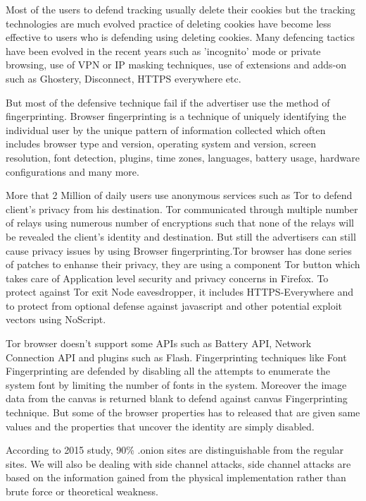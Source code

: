\documentclass[conference]{IEEEtran}
\begin{document}
Most of the users to defend tracking usually delete their cookies but the tracking technologies are much evolved practice of deleting cookies have become less effective to users who is defending using deleting cookies. Many defencing tactics have been evolved in the recent years such as 'incognito' mode or private browsing, use of VPN or IP masking techniques, use of extensions and adds-on such as Ghostery, Disconnect, HTTPS everywhere etc.

But most of the defensive technique fail if the advertiser use the method of fingerprinting. Browser fingerprinting is a technique of uniquely identifying the individual user by the unique pattern of information collected which often includes browser type and version, operating system and version, screen resolution, font detection, plugins, time zones, languages, battery usage, hardware configurations and many more.

More that 2 Million of daily users use anonymous services such as Tor to defend client's privacy from his destination. Tor communicated through multiple number of relays using numerous number of encryptions such that none of the relays will be revealed the client's identity and destination. But still the advertisers can still cause privacy issues by using Browser fingerprinting.Tor browser has done series of patches to enhanse their privacy, they are using a component Tor button which takes care of Application level security and privacy concerns in Firefox. To protect against Tor exit Node eavesdropper, it includes HTTPS-Everywhere and to protect from optional defense against javascript and other potential exploit vectors using NoScript.

Tor browser doesn't support some APIs such as Battery API, Network Connection API and plugins such as Flash. Fingerprinting techniques like Font Fingerprinting are defended by disabling all the attempts to enumerate the system font by limiting the number of fonts in the system. Moreover the image data from the canvas is returned blank to defend against canvas Fingerprinting technique. But some of the browser properties has to released that are given same values and the properties that uncover the identity are simply disabled.

According to 2015 study, 90\% .onion sites are distinguishable from the regular sites. We will also be dealing with side channel attacks, side channel attacks are based on the information gained from the physical implementation rather than brute force or theoretical weakness. 
\end{document}
